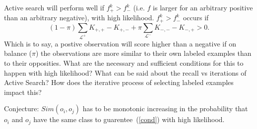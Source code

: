 \documentclass[12pt]{article}
\begin{document}
Active search will perform well if $f^k_+>f^k_-$ (i.e. $f$ is larger for an arbitrary positive than an arbitrary negative), with high likelihood. $f^k_+>f^k_-$ occurs if 
\begin{equation}
   (1-\pi)\sum_{\mathcal{L}^+} K_{+,+}-K_{+,-} +\pi\sum_{\mathcal{L}^-} K_{-,-}-K_{-,+} > 0. \label{cond}
\end{equation}
Which is to say, a postive observation will score higher than a negative if on balance ($\pi$) the observations are more similar to their own labeled examples than to their opposities. What are the necessary and sufficient conditions for this to happen with high likelihood? What can be said about the recall vs iterations of Active Search? How does the iterative process of selecting labeled examples impact this?

Conjecture: $Sim(o_i,o_j)$ has to be monotonic increasing in the probability that $o_i$ and $o_j$ have the same class to guarentee~(\ref{cond}) with high likelihood.
\end{document}
